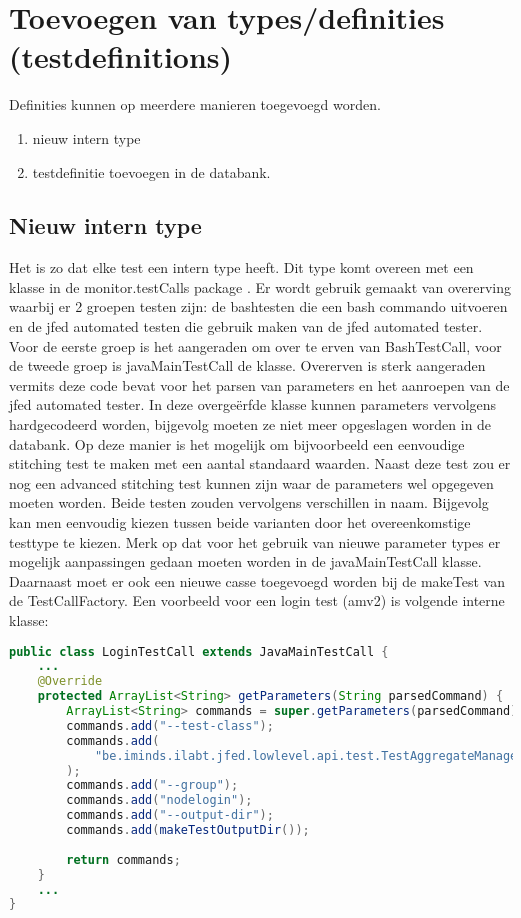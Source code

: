 \clearpage
\section{Toevoegen van types/definities (testdefinitions)}
\npar
Definities kunnen op meerdere manieren toegevoegd worden.
\begin{enumerate}
\item nieuw intern type
\item testdefinitie toevoegen in de databank.
\end{enumerate}

\subsection{Nieuw intern type}
Het is zo dat elke test een intern type heeft. Dit type komt overeen met een klasse in de monitor.testCalls package . Er wordt gebruik gemaakt van overerving waarbij er 2 groepen testen zijn: de bashtesten die een bash commando uitvoeren en de jfed automated testen die gebruik maken van de jfed automated tester. Voor de eerste groep is het aangeraden om over te erven van BashTestCall, voor de tweede groep is javaMainTestCall de klasse. Overerven is sterk aangeraden vermits deze code bevat voor het parsen van parameters en het aanroepen van de jfed automated tester. In deze overge\"erfde klasse kunnen parameters vervolgens hardgecodeerd worden, bijgevolg moeten ze niet meer opgeslagen worden in de databank.
\npar
Op deze manier is het mogelijk om bijvoorbeeld een eenvoudige stitching test te maken met een aantal standaard waarden. Naast deze test zou er nog een advanced stitching test kunnen zijn waar de parameters wel opgegeven moeten worden. Beide testen zouden vervolgens verschillen in naam. Bijgevolg kan men eenvoudig kiezen tussen beide varianten door het overeenkomstige testtype te kiezen.
\npar
Merk op dat voor het gebruik van nieuwe parameter types er mogelijk aanpassingen gedaan moeten worden in de javaMainTestCall klasse. Daarnaast moet er ook een nieuwe casse toegevoegd worden bij de makeTest van de TestCallFactory.
\clearpage
\npar
Een voorbeeld voor een login test (amv2) is volgende interne klasse:
\begin{lstlisting}[language=Java]
public class LoginTestCall extends JavaMainTestCall {	
	...
    @Override
    protected ArrayList<String> getParameters(String parsedCommand) {
        ArrayList<String> commands = super.getParameters(parsedCommand);
        commands.add("--test-class");
        commands.add(
        	"be.iminds.ilabt.jfed.lowlevel.api.test.TestAggregateManager2"
        );
        commands.add("--group");
        commands.add("nodelogin");
        commands.add("--output-dir");
        commands.add(makeTestOutputDir());
        
        return commands;
    }
    ...
}
\end{lstlisting}
